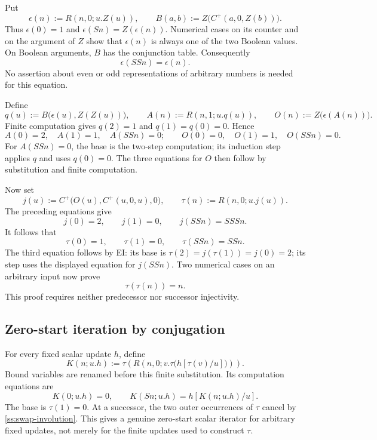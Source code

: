 \documentclass[11pt,letterpaper]{article}
\theoremstyle{definition}\newtheorem{definition}[theorem]{Definition}
\theoremstyle{remark}\newtheorem{remark}[theorem]{Remark}
\begin{document}
Put
\[
 \epsilon(n):=R(n,0;u.Z(u)),\qquad
 B(a,b):=Z\bigl(C^+(a,0,Z(b))\bigr).
\]
Thus $\epsilon(0)=1$ and $\epsilon(Sn)=Z(\epsilon(n))$.
Numerical cases on its counter and on the argument of $Z$ show that
$\epsilon(n)$ is always one of the two Boolean values.  On Boolean
arguments, $B$ has the conjunction table.  Consequently
\[
 \epsilon(SSn)=\epsilon(n).
 \label{ss:parity-period}
\]
No assertion about even or odd representations of arbitrary numbers is
needed for this equation.

Define
\[
 q(u):=B\bigl(\epsilon(u),Z(Z(u))\bigr),\qquad
 A(n):=R(n,1;u.q(u)),\qquad
 O(n):=Z\bigl(\epsilon(A(n))\bigr).
\]
Finite computation gives $q(2)=1$ and $q(1)=q(0)=0$.  Hence
\[
 A(0)=2,\quad A(1)=1,\quad A(SSn)=0;
 \qquad O(0)=0,\quad O(1)=1,\quad O(SSn)=0.
 \label{ss:one-indicator}
\]
For $A(SSn)=0$, the base is the two-step computation; its induction
step applies $q$ and uses $q(0)=0$.  The three equations for $O$ then
follow by substitution and finite computation.

Now set
\[
 j(u):=C^+\bigl(O(u),C^+(u,0,u),0\bigr),\qquad
 \tau(n):=R(n,0;u.j(u)).
\]
The preceding equations give
\[
 j(0)=2,\qquad j(1)=0,\qquad j(SSn)=SSSn.
\]
It follows that
\begin{equation}
 \tau(0)=1,\qquad \tau(1)=0,\qquad \tau(SSn)=SSn.
 \label{ss:swap}
\end{equation}
The third equation follows by EI: its base is
$\tau(2)=j(\tau(1))=j(0)=2$; its step uses the displayed equation
for $j(SSn)$.  Two numerical cases on an arbitrary input now prove
\begin{equation}
                         \tau(\tau(n))=n.
 \label{ss:swap-involution}
\end{equation}
This proof requires neither predecessor nor successor injectivity.

\subsection{Zero-start iteration by conjugation}

For every fixed scalar update $h$, define
\begin{equation}
 K(n;u.h):=
 \tau\!\left(R\left(n,0;
       v.\tau\bigl(h[\tau(v)/u]\bigr)\right)\right).
 \label{ss:zero-iterator}
\end{equation}
Bound variables are renamed before this finite substitution.  Its
computation equations are
\begin{equation}
 K(0;u.h)=0,\qquad
 K(Sn;u.h)=h[K(n;u.h)/u].
 \label{ss:k-computation}
\end{equation}
The base is $\tau(1)=0$.  At a successor, the two outer occurrences
of $\tau$ cancel by \eqref{ss:swap-involution}.
This gives a genuine zero-start scalar iterator for arbitrary fixed
updates, not merely for the finite updates used to construct $\tau$.
\end{document}
